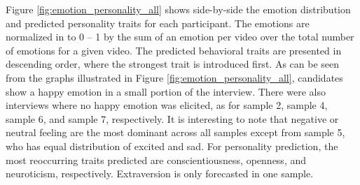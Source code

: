 Figure \ref{fig:emotion_personality_all} shows side-by-side the emotion distribution and predicted personality traits for each participant. The emotions are normalized in to 0 -- 1 by the sum of an emotion per video over the total number of emotions for a given video. The predicted behavioral traits are presented in descending order, where the strongest trait is introduced first. As can be seen from the graphs illustrated in Figure \ref{fig:emotion_personality_all}, candidates show a happy emotion in a small portion of the interview. There were also interviews where no happy emotion was elicited, as for sample 2, sample 4, sample 6, and sample 7, respectively. It is interesting to note that negative or neutral feeling are the most dominant across all samples except from sample 5, who has equal distribution of excited and sad. For personality prediction, the most reoccurring traits predicted are conscientiousness, openness, and neuroticism, respectively. Extraversion is only forecasted in one sample. 
\newpage
